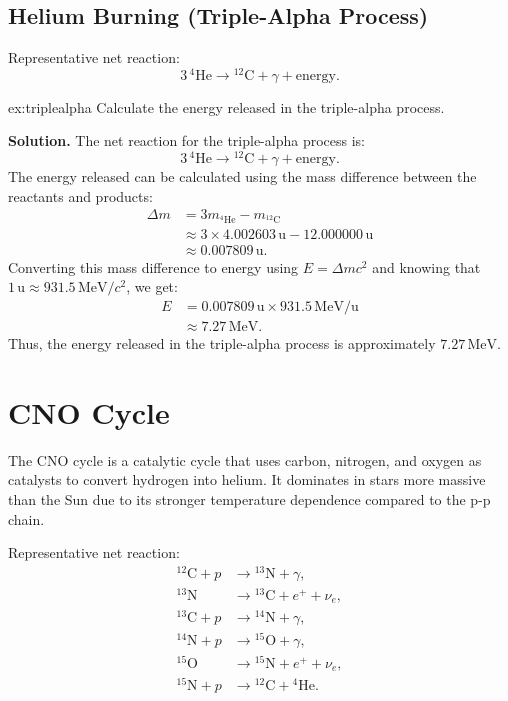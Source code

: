 \subsection{Helium Burning (Triple-Alpha Process)}
\begin{foundation}
Representative net reaction:
\begin{equation}
    3\,{}^4\text{He}\rightarrow{}^{12}\text{C}+\gamma+\text{energy}.
\end{equation}
\end{foundation}
\begin{example}{}{ex:triplealpha}
Calculate the energy released in the triple-alpha process.

\smallskip\textbf{Solution.}
The net reaction for the triple-alpha process is:    
\begin{equation}
    3\,{}^4\text{He}\rightarrow{}^{12}\text{C}+\gamma+\text{energy}.  
\end{equation}
The energy released can be calculated using the mass difference between the reactants and products:
\begin{align*}
\Delta m &= 3m_{^4\text{He}} - m_{^{12}\text{C}} \\
&\approx 3 \times 4.002603\,\text{u} - 12.000000\,\text{u} \\
&\approx 0.007809\,\text{u}.  
\end{align*}
Converting this mass difference to energy using $E = \Delta m c^2$ and
knowing that $1\,\text{u} \approx 931.5\,\text{MeV}/c^2$, we get:
\begin{align*}
E &= 0.007809\,\text{u} \times 931.5\,\text{MeV}/\text{u} \\
&\approx 7.27\,\text{MeV}.
\end{align*}
Thus, the energy released in the triple-alpha process is approximately $7.27\,\text{MeV}$.
\end{example}

\section{CNO Cycle}
The CNO cycle is a catalytic cycle that uses carbon, nitrogen, and oxygen as catalysts to convert hydrogen into helium. 
It dominates in stars more massive than the Sun due to its stronger temperature dependence compared to the p-p chain.
\begin{foundation}
Representative net reaction:
\begin{align}
^12\text{C} + p &\rightarrow {}^{13}\text{N} + \gamma, \\
{}^{13}\text{N} &\rightarrow {}^{13}\text{C} + e^+ + \nu_e, \\
{}^{13}\text{C} + p &\rightarrow {}^{14}\text{N} + \gamma, \\
{}^{14}\text{N} + p &\rightarrow {}^{15}\text{O} + \gamma, \\
{}^{15}\text{O} &\rightarrow {}^{15}\text{N} + e^+ + \nu_e, \\
{}^{15}\text{N} + p &\rightarrow {}^{12}\text{C} + {}^4\text{He}.
\end{align}
\end{foundation}

